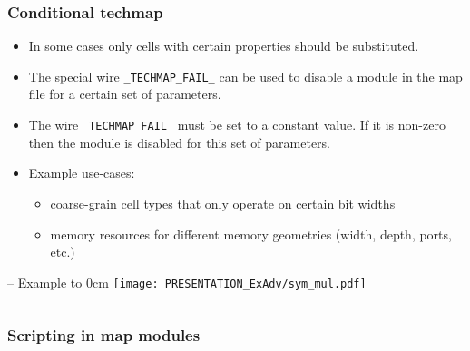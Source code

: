 \subsubsection{Conditional techmap}

\begin{frame}{\subsubsecname}
\begin{itemize}
\item In some cases only cells with certain properties should be substituted.
\medskip
\item The special wire {\tt \_TECHMAP\_FAIL\_} can be used to disable a module
in the map file for a certain set of parameters.
\medskip
\item The wire {\tt \_TECHMAP\_FAIL\_} must be set to a constant value. If it
is non-zero then the module is disabled for this set of parameters.
\medskip
\item Example use-cases:
\begin{itemize}
\item coarse-grain cell types that only operate on certain bit widths
\item memory resources for different memory geometries (width, depth, ports, etc.)
\end{itemize}
\end{itemize}
\end{frame}

\begin{frame}[t]{\subsubsecname{} -- Example}
\vbox to 0cm{
\vskip-0.5cm
\hfill\texttt{[image: PRESENTATION\_ExAdv/sym\_mul.pdf]}
\vss
}
\vskip-0.5cm

\begin{columns}
\column[t]{6cm}
\vskip-0.5cm
\column[t]{4cm}
\vskip-0.5cm
\end{columns}
\end{frame}

\subsubsection{Scripting in map modules}

